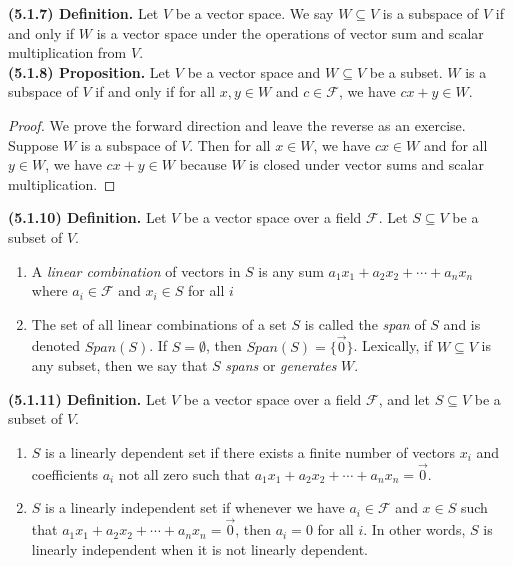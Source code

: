 \documentclass[12pt]{book}
\def\cF{{\mathcal{F}}}
\begin{document}
\noindent\textbf{(5.1.7) Definition.} Let $V$ be a vector space. We say $W\subseteq V$ is a subspace of $V$ if and only if $W$ is a vector space under the operations of vector sum and scalar multiplication from $V$.\\

\noindent\textbf{(5.1.8) Proposition.} Let $V$ be a vector space and $W\subseteq V$ be a subset. $W$ is a subspace of $V$ if and only if for all $x,y\in W$ and $c\in\cF$, we have $cx+y\in W$.

\begin{proof}
We prove the forward direction and leave the reverse as an exercise. Suppose $W$ is a subspace of $V$. Then for all $x\in W$, we have $cx\in W$ and for all $y\in W$, we have $cx+y\in W$ because $W$ is closed under vector sums and scalar multiplication.
\end{proof}





\noindent\textbf{(5.1.10) Definition.} Let $V$ be a vector space over a field $\cF$. Let $S\subseteq V$ be a subset of $V$.
\begin{enumerate}[label=(\alph*)]
\item A \textit{linear combination} of vectors in $S$ is any sum $a_1x_1+a_2x_2+\cdots+a_nx_n$ where $a_i\in\cF$ and $x_i\in S$ for all $i$
\item The set of all linear combinations of a set $S$ is called the \textit{span} of $S$ and is denoted $Span(S)$. If $S=\emptyset$, then $Span(S)=\{\vec{0}\}$. Lexically, if $W\subseteq V$ is any subset, then we say that $S$ \textit{spans} or \textit{generates} $W$. 
\end{enumerate}

\noindent\textbf{(5.1.11) Definition.} Let $V$ be a vector space over a field $\cF$, and let $S\subseteq V$ be a subset of $V$.
\begin{enumerate}[label=(\alph*)]
\item $S$ is a linearly dependent set if there exists a finite number of vectors $x_i$ and coefficients $a_i$ not all zero such that $a_1x_1+a_2x_2+\cdots+a_nx_n=\vec{0}$.
\item $S$ is a linearly independent set if whenever we have $a_i\in\cF$ and $x\in S$ such that $a_1x_1+a_2x_2+\cdots+a_nx_n=\vec{0}$, then $a_i=0$ for all $i$. In other words, $S$ is linearly independent when it is not linearly dependent.
\end{enumerate}
\end{document}
